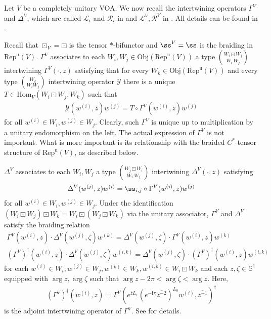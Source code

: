 \documentclass[11pt,b5paper,notitlepage]{article}
\theoremstyle{definition}
\theoremstyle{plain}
\newcommand{\mc}{\mathcal}
\newcommand{\ovl}{\overline}
\newcommand{\Hom}{\mathrm{Hom}}
\newcommand{\uni}{\mathrm{u}}
\newcommand{\im}{\mathbf{i}}
\newcommand{\RepV}{{\mathrm{Rep}^\uni(V)}}
\newcommand{\Sbb}{{\mathbb S}}
\newcommand{\Obj}{\mathrm{Obj}}
\numberwithin{equation}{section}
\begin{document}
Let $V$ be a completely unitary VOA. We now recall the intertwining operators $\Gamma^V$ and $\Delta^V$, which are called $\mc L_i$ and $\mc R_i$ in \cite[Sec. 4.2]{Gui21a} and $\mc L^V,\mc R^V$ in \cite[Sec. 2.5]{Gui20}. All details can be found in \cite[Ch. 4]{Gui21a}.





Recall that $\boxdot_V=\boxdot$ is the tensor $*$-bifunctor and $\ss^V=\ss$ is the braiding in $\RepV$. $\Gamma^V$ associates to each $W_i,W_j\in\Obj(\RepV)$ a type $W_i\boxdot W_j\choose W_i~W_j$ intertwining $\Gamma^V(\cdot,z)$ satisfying that for every $W_k\in\Obj(\RepV)$ and every type $W_k\choose W_iW_j$ intertwining operator $\mc Y$ there is a unique $T\in\Hom_V(W_i\boxdot W_j,W_k)$ such that
\begin{align}\label{eq53}
\mc Y(w^{(i)},z)w^{(j)}=T\circ \Gamma^V(w^{(i)},z)w^{(j)}
\end{align}
for all $w^{(i)}\in W_i,w^{(j)}\in W_j$. Clearly, such $\Gamma^V$ is unique up to multiplication by a unitary endomorphism on the left. The actual expression of $\Gamma^V$ is not important. What is more important is its relationship with the braided $C^*$-tensor structure of $\RepV$, as described below.


$\Delta^V$ associates to each $W_i,W_j$ a type $W_j\boxdot W_i\choose W_i~W_j$ intertwining $\Delta^V(\cdot,z)$ satisfying
\begin{align}\label{eq34}
\Delta^V(w^{(j)},z)w^{(i)}=\ss_{i,j}\circ \Gamma^V(w^{(i)},z)w^{(j)}
\end{align}
for all $w^{(i)}\in W_i,w^{(j)}\in W_j$. Under the identification $(W_i\boxdot W_j)\boxdot W_k=W_i\boxdot(W_j\boxdot W_k)$ via the unitary associator, $\Gamma^V$ and $\Delta^V$ satisfy the braiding relation 
\begin{subequations}\label{eq35}
\begin{gather}
\Gamma^V(w^{(i)},z)\cdot\Delta^V(w^{(j)},\zeta)w^{(k)}=\Delta^V(w^{(j)},\zeta)\cdot\Gamma^V(w^{(i)},z)w^{(k)}\\
(\Gamma^V)^\dagger(w^{(i)},z)\cdot\Delta^V(w^{(j)},\zeta)w^{(i,k)}=\Delta^V(w^{(j)},\zeta)\cdot(\Gamma^V)^\dagger(w^{(i)},z)w^{(i,k)}
\end{gather}
\end{subequations}
for each $w^{(i)}\in W_i,w^{(j)}\in W_j,w^{(k)}\in W_k,w^{(i,k)}\in W_i\boxdot W_k$ and each $z,\zeta\in\Sbb^1$ equipped with $\arg z,\arg\zeta$ such that $\arg z-2\pi<\arg\zeta<\arg z$. Here, 
\begin{align*}
(\Gamma^V)^\dagger(w^{(i)},z)=\Gamma^V(e^{\ovl zL_1}(e^{-\im\pi}\ovl {z^{-2}})^{L_0}w^{(i)},\ovl {z^{-1}})^\dagger
\end{align*} 
is the adjoint intertwining operator of $\Gamma^V$. See \cite[Sec. 4.3]{Gui21a} for details. 
\end{document}
